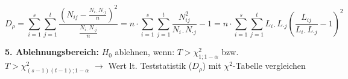 \begin{equation*}
    D_{\rho} = \sum_{i=1}^{s}\sum_{j=1}^{t}\frac{(N_{ij}-\frac{N_{i\cdot}N_{\cdot j}}{n})^2}{\frac{N_{i\cdot}N_{\cdot j}}{n}} = n \cdot \sum_{i=1}^{s}\sum_{j=1}^{t}\frac{N_{ij}^2}{N_{i\cdot}N_{\cdot j}}-1 = n \cdot \sum_{i=1}^{s}\sum_{j=1}^{t}L_{i\cdot}L_{\cdot j}\left(\frac{L_{ij}}{L_{i\cdot}L_{\cdot j}}-1\right)^2
\end{equation*}

\textbf{5. Ablehnungsbereich:} \(H_0\) ablehnen, wenn:  \(T > \chi^2_{1;1-\alpha}\) bzw. \(T > \chi^2_{(s-1)(t-1);1-\alpha}\) \(\rightarrow\) Wert lt. Teststatistik (\(D_\rho\)) mit \(\chi^2\)-Tabelle vergleichen